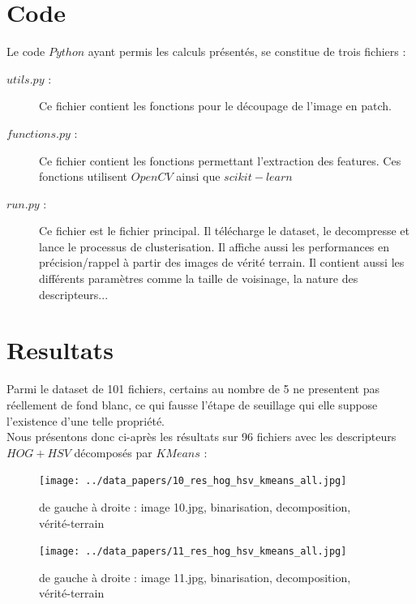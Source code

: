 \documentclass{book}
\begin{document}
\chapter{Code}

Le code $Python$ ayant permis les calculs présentés, se constitue de trois fichiers :
\begin{description} %

\item[$utils.py$ :] Ce fichier contient les fonctions pour le découpage de l'image en patch.
\item[$functions.py$ :] Ce fichier contient les fonctions permettant l'extraction des features. Ces fonctions utilisent $OpenCV$ \cite{opencv_library} ainsi que $scikit-learn$ \cite{scikit-learn}
\item[$run.py$ :] Ce fichier est le fichier principal. Il télécharge le dataset, le decompresse et lance le processus de clusterisation. Il affiche aussi les performances
en précision/rappel à partir des images de vérité terrain. Il contient aussi les différents paramètres comme la taille de voisinage, la nature des descripteurs...

\end{description}


\chapter{Resultats}

Parmi le dataset de 101 fichiers, certains au nombre de 5 ne presentent pas réellement de fond blanc, ce qui fausse l'étape de seuillage qui elle suppose l'existence d'une telle
propriété.\\
Nous présentons donc ci-après les résultats sur 96 fichiers avec les descripteurs $HOG+HSV$ décomposés par $KMeans$ :\\

\begin{figure}[H]
\begin{center}
\texttt{[image: ../data\_papers/10\_res\_hog\_hsv\_kmeans\_all.jpg]}
\end{center}
\caption{de gauche à droite : image 10.jpg, binarisation, decomposition, vérité-terrain}
\label{10}
\end{figure}
\clearpage


\begin{figure}[H]
\begin{center}
\texttt{[image: ../data\_papers/11\_res\_hog\_hsv\_kmeans\_all.jpg]}
\end{center}
\caption{de gauche à droite : image 11.jpg, binarisation, decomposition, vérité-terrain}
\label{11}
\end{figure}
\clearpage
\end{document}
